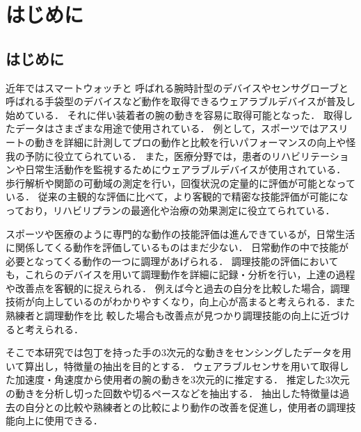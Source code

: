 \chapter{はじめに}
\section{はじめに}
近年ではスマートウォッチと
呼ばれる腕時計型のデバイスやセンサグローブと呼ばれる手袋型のデバイスなど動作を取得できるウェアラブルデバイスが普及し始めている．
それに伴い装着者の腕の動きを容易に取得可能となった．
取得したデータはさまざまな用途で使用されている．
例として，スポーツではアスリートの動きを詳細に計測してプロの動作と比較を行いパフォーマンスの向上や怪我の予防に役立てられている．
また，医療分野では，患者のリハビリテーションや日常生活動作を監視するためにウェアラブルデバイスが使用されている．
歩行解析や関節の可動域の測定を行い，回復状況の定量的に評価が可能となっている．
従来の主観的な評価に比べて，より客観的で精密な技能評価が可能になっており，リハビリプランの最適化や治療の効果測定に役立てられている．

スポーツや医療のように専門的な動作の技能評価は進んできているが，日常生活に関係してくる動作を評価しているものはまだ少ない．
日常動作の中で技能が必要となってくる動作の一つに調理があげられる．
調理技能の評価においても，これらのデバイスを用いて調理動作を詳細に記録・分析を行い，上達の過程や改善点を客観的に捉えられる．
例えば今と過去の自分を比較した場合，調理技術が向上しているのがわかりやすくなり，向上心が高まると考えられる．また熟練者と調理動作を比
較した場合も改善点が見つかり調理技能の向上に近づけると考えられる．

そこで本研究では包丁を持った手の3次元的な動きをセンシングしたデータを用いて算出し，特徴量の抽出を目的とする．
ウェアラブルセンサを用いて取得した加速度・角速度から使用者の腕の動きを3次元的に推定する．
推定した3次元の動きを分析し切った回数や切るペースなどを抽出する．
抽出した特徴量は過去の自分との比較や熟練者との比較により動作の改善を促進し，使用者の調理技能向上に使用できる．
